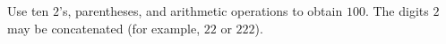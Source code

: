 Use ten $2$'s, parentheses, and arithmetic operations to obtain $100$. The digits $2$ may be concatenated (for example, $22$ or $222$).
